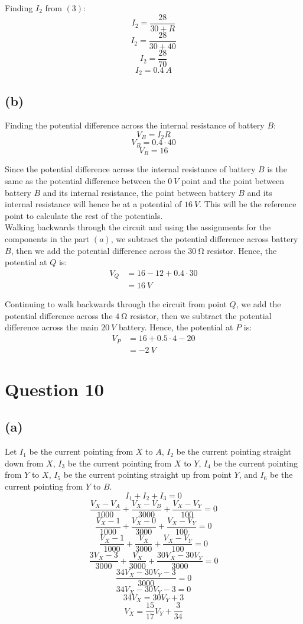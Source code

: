 \documentclass[11pt]{article}
\begin{document}
Finding \(I_2\) from \((3)\):
\[I_2 = \frac{28}{30 + R}\]
\[I_2 = \frac{28}{30 + 40}\]
\[I_2 = \frac{28}{70}\]
\[I_2 = \qty{0.4}{\unit{A}}\]

\subsection{(b)}
\label{sec:orgbde642c}
Finding the potential difference across the internal resistance of battery \(B\):
\[V_{B} = I_2 R\]
\[V_{B} = 0.4 \cdot 40\]
\[V_{B} = 16\]

Since the potential difference across the internal resistance of battery \(B\) is the same as the potential difference between the \(\qty{0}{\unit{V}}\) point and the point between battery \(B\) and its internal resistance, the point between battery \(B\) and its internal resistance will hence be at a potential of \(\qty{16}{\unit{V}}\). This will be the reference point to calculate the rest of the potentials.
\\[0pt]

Walking backwards through the circuit and using the assignments for the components in the part \((a)\), we subtract the potential difference across battery \(B\), then we add the potential difference across the \(\qty{30}{\unit{\ohm}}\) resistor. Hence, the potential at \(Q\) is:
\begin{align*}
V_Q &= 16 - 12 + 0.4 \cdot 30 \\
&= \qty{16}{\unit{V}}
\end{align*}

Continuing to walk backwards through the circuit from point \(Q\), we add the potential difference across the \(\qty{4}{\unit{\ohm}}\) resistor, then we subtract the potential difference across the main \(\qty{20}{\unit{V}}\) battery. Hence, the potential at \(P\) is:
\begin{align*}
V_P &= 16 + 0.5 \cdot 4 - 20 \\
&= \qty{-2}{\unit{V}}
\end{align*}

\section{Question 10}
\label{sec:orgdf65356}

\subsection{(a)}
\label{sec:orgc574c1b}
Let \(I_1\) be the current pointing from \(X\) to \(A\), \(I_2\) be the current pointing straight down from \(X\), \(I_3\) be the current pointing from \(X\) to \(Y\), \(I_4\) be the current pointing from \(Y\) to \(X\), \(I_5\) be the current pointing straight up from point \(Y\), and \(I_6\) be the current pointing from \(Y\) to \(B\).
\[I_1 + I_2 + I_3 = 0\]
\[\frac{V_X - V_A}{1000} + \frac{V_X - V_B}{3000} + \frac{V_X - V_Y}{100} = 0\]
\[\frac{V_X - 1}{1000} + \frac{V_X - 0}{3000} + \frac{V_X - V_Y}{100} = 0\]
\[\frac{V_X - 1}{1000} + \frac{V_X}{3000} + \frac{V_X - V_Y}{100} = 0\]
\[\frac{3V_X - 3}{3000} + \frac{V_X}{3000} + \frac{30V_X - 30V_Y}{3000} = 0\]
\[\frac{34V_X - 30V_Y - 3}{3000} = 0\]
\[34V_X - 30V_Y - 3 = 0\]
\[34V_X = 30V_Y + 3\]
\[V_X = \frac{15}{17}V_Y + \frac{3}{34} \tag{1}\]
\end{document}
